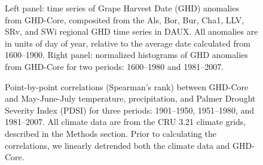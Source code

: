 \documentclass[final]{nature}
\begin{document}

\begin{figure}
\caption{Left panel: time series of Grape Harvest Date (GHD) anomalies from GHD-Core, composited from the Als, Bor, Bur, Cha1, LLV, SRv, and SWi regional GHD time series in DAUX. All anomalies are in units of day of year, relative to the average date calculated from 1600--1900. Right panel: normalized histograms of GHD anomalies from GHD-Core for two periods: 1600--1980 and 1981--2007.}
\end{figure}

\begin{figure}
\caption{Point-by-point correlations (Spearman's rank) between GHD-Core and May-June-July temperature, precipitation, and Palmer Drought Severity Index (PDSI) for three periods: 1901--1950, 1951--1980, and 1981--2007. All climate data are from the CRU 3.21 climate grids, described in the Methods section. Prior to calculating the correlations, we linearly detrended both the climate data and GHD-Core.}
\end{figure}
\end{document}
